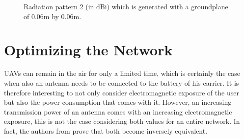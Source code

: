 \begin{figure}[!htb]
\caption{Radiation pattern 2 (in dBi) which is generated with a groundplane of 0.06m by 0.06m. }
 \label{radpattern1}
\end{figure}

\section{Optimizing the Network}
\label{sec:methodology:optimizingTheNetwork}

\gls{UAV}s can remain in the air for only a limited time, which is certainly 
the case when also an antenna needs to be connected to the battery of his carrier. It is therefore
interesting to not only consider electromagnetic exposure of the user but also the power consumption that comes with it. 
However, an increasing transmission power of an antenna comes with an increasing electromagnetic exposure, this is not the case considering
both values for an entire network. In fact, the authors from \cite{J1}  prove that both become inversely equivalent.

